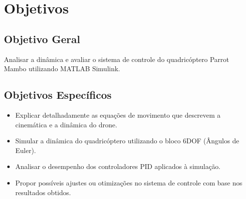 \section{Objetivos}

\subsection{Objetivo Geral}
Analisar a dinâmica e avaliar o sistema de controle do quadricóptero Parrot Mambo utilizando MATLAB Simulink.

\subsection{Objetivos Específicos}
\begin{itemize}
    \item Explicar detalhadamente as equações de movimento que descrevem a cinemática e a dinâmica do drone.
    \item Simular a dinâmica do quadricóptero utilizando o bloco 6DOF (Ângulos de Euler).
    \item Analisar o desempenho dos controladores PID aplicados à simulação.
    \item Propor possíveis ajustes ou otimizações no sistema de controle com base nos resultados obtidos.
\end{itemize}





\printindex

